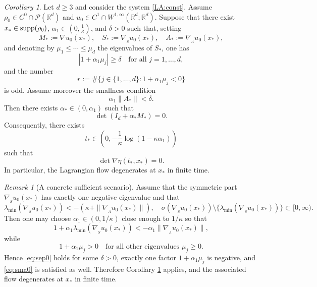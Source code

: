 \documentclass[11pt]{amsart}
\numberwithin{equation}{section}
\newtheorem{corollary}[theorem]{Corollary}
\theoremstyle{definition}
\theoremstyle{remark}
\newtheorem{remark}[theorem]{Remark}
\numberwithin{equation}{section}
\newtheorem{corollary}[theorem]{Corollary}
\newtheorem{remark}[theorem]{Remark}
\newcommand{\R}{\mathbb R}
\newcommand{\bq}{\begin{equation}}
\newcommand{\eq}{\end{equation}}
\newcommand{\lt}{\left}
\newcommand{\rt}{\right}
\newcommand{\calP}{\mathcal P}
\newcommand{\supp}{{\rm supp}}
\newcommand{\nabS}{\nabla_{\!\!{}_S}}
\newcommand{\nabA}{\nabla_{\!\!{}_A}}
\renewcommand{\geq}{\geqslant}
\renewcommand{\ge}{\geqslant}
\renewcommand{\le}{\leqslant}
\begin{document}
 


\begin{corollary} \label{cor:gen_sup_const}
Let $d \geq 3$ and consider the system \eqref{LA:const}. Assume $\rho_0\in C^0\cap\calP(\R^d)$ and $u_0\in C^1\cap W^{1,\infty}(\R^d;\R^d)$. Suppose that there exist $x_*\in\supp(\rho_0)$, $\alpha_1\in(0,\frac1\kappa)$, and $\delta>0$ such that, setting
\[
M_*:=\nabla u_0(x_*),\quad S_*:=\nabS u_0(x_*),\quad A_*:=\nabA u_0(x_*),
\]
and denoting by $\mu_1\le\cdots\le\mu_d$ the eigenvalues of $S_*$, one has
\bq\label{eq:sep0}
|1+\alpha_1\mu_j|\ge \delta \quad\text{for all }j=1,\dots,d,
\eq
and the number
\[
r:=\#\{j\in\{1,\dots,d\}:1+\alpha_1\mu_j<0\}
\]
is odd. Assume moreover the smallness condition
\bq\label{eq:sma0}
\alpha_1\|A_*\|<\delta.
\eq
Then there exists $\alpha_*\in(0,\alpha_1)$ such that
\[
\det(I_d+\alpha_*M_*)=0.
\]
Consequently, there exists
\[
t_*\in\lt(0,-\frac1\kappa\log(1-\kappa\alpha_1)\rt)
\]
such that
\[
\det\nabla\eta(t_*,x_*)=0.
\]
In particular, the Lagrangian flow degenerates at $x_*$ in finite time.
\end{corollary}

\begin{remark}[A concrete sufficient scenario]
Assume that the symmetric part $\nabS u_0(x_*)$ has exactly one negative eigenvalue and that
\[
\lambda_{\min} (\nabS u_0(x_*)) < -(\kappa+\|\nabA u_0(x_*)\|), \quad \sigma(\nabS u_0(x_*))\setminus\{\lambda_{\min}(\nabS u_0(x_*))\}\subset[0,\infty).
\]
Then one may choose $\alpha_1\in(0,1/\kappa)$ close enough to $1/\kappa$ so that
\[
1+\alpha_1\lambda_{\min}(\nabS u_0(x_*))<-\alpha_1\|\nabA u_0(x_*)\|,
\]
while
\[
1+\alpha_1\mu_j>0
\quad\text{for all other eigenvalues }\mu_j\ge0.
\]
Hence \eqref{eq:sep0} holds for some $\delta>0$, exactly one factor $1+\alpha_1\mu_j$ is negative, and \eqref{eq:sma0} is satisfied as well. Therefore Corollary \ref{cor:gen_sup_const} applies, and the associated flow degenerates at $x_*$ in finite time.
\end{remark}
\end{document}

